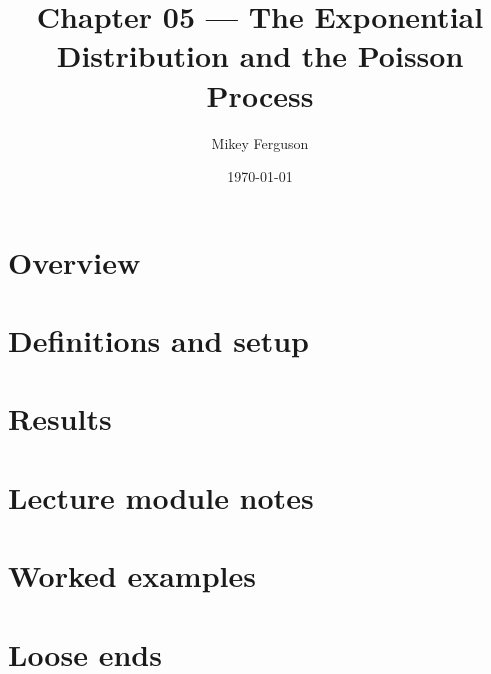 \documentclass[11pt]{article}
\title{Chapter 05 --- The Exponential Distribution and the Poisson Process}
\author{Mikey Ferguson}
\date{\today}
\begin{document}
\maketitle
\tableofcontents
\bigskip

\section{Overview}

\section{Definitions and setup}

\section{Results}

\section{Lecture module notes}

\section{Worked examples}

\section{Loose ends}
\end{document}
